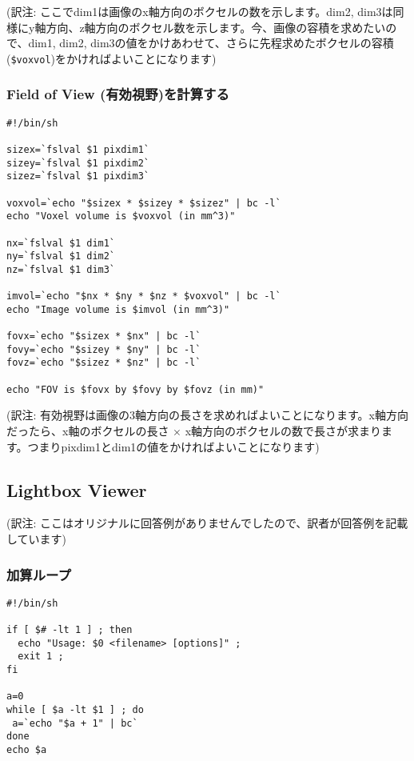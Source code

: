 \documentclass{jsarticle}
\begin{document}
\noindent (訳注: ここでdim1は画像のx軸方向のボクセルの数を示します。dim2, dim3は同様にy軸方向、z軸方向のボクセル数を示します。今、画像の容積を求めたいので、dim1, dim2, dim3の値をかけあわせて、さらに先程求めたボクセルの容積({\tt \$voxvol})をかければよいことになります)

\subsubsection{Field of View (有効視野)を計算する}

\begin{verbatim}
#!/bin/sh

sizex=`fslval $1 pixdim1`
sizey=`fslval $1 pixdim2`
sizez=`fslval $1 pixdim3`

voxvol=`echo "$sizex * $sizey * $sizez" | bc -l` 
echo "Voxel volume is $voxvol (in mm^3)"

nx=`fslval $1 dim1`
ny=`fslval $1 dim2`
nz=`fslval $1 dim3`

imvol=`echo "$nx * $ny * $nz * $voxvol" | bc -l`
echo "Image volume is $imvol (in mm^3)"

fovx=`echo "$sizex * $nx" | bc -l`
fovy=`echo "$sizey * $ny" | bc -l`
fovz=`echo "$sizez * $nz" | bc -l`

echo "FOV is $fovx by $fovy by $fovz (in mm)"
\end{verbatim}

\noindent (訳注: 有効視野は画像の3軸方向の長さを求めればよいことになります。x軸方向だったら、x軸のボクセルの長さ $\times$ x軸方向のボクセルの数で長さが求まります。つまりpixdim1とdim1の値をかければよいことになります)

\subsection{Lightbox Viewer}

\noindent(訳注: ここはオリジナルに回答例がありませんでしたので、訳者が回答例を記載しています)

\subsubsection{加算ループ}

\begin{verbatim}
#!/bin/sh

if [ $# -lt 1 ] ; then
  echo "Usage: $0 <filename> [options]" ;
  exit 1 ;
fi

a=0
while [ $a -lt $1 ] ; do
 a=`echo "$a + 1" | bc`
done
echo $a
\end{verbatim}
\end{document}

